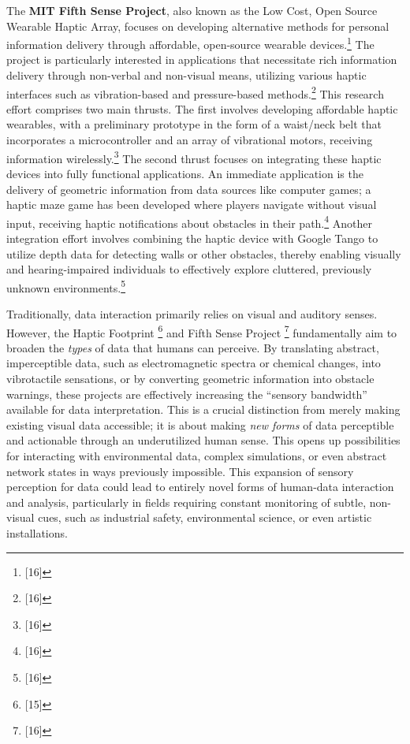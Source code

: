 The \textbf{MIT Fifth Sense Project}, also known as the Low Cost, Open Source Wearable Haptic Array, focuses on developing alternative methods for personal information delivery through affordable, open-source wearable devices.\footnote{[16]} The project is particularly interested in applications that necessitate rich information delivery through non-verbal and non-visual means, utilizing various haptic interfaces such as vibration-based and pressure-based methods.\footnote{[16]} This research effort comprises two main thrusts. The first involves developing affordable haptic wearables, with a preliminary prototype in the form of a waist/neck belt that incorporates a microcontroller and an array of vibrational motors, receiving information wirelessly.\footnote{[16]} The second thrust focuses on integrating these haptic devices into fully functional applications. An immediate application is the delivery of geometric information from data sources like computer games; a haptic maze game has been developed where players navigate without visual input, receiving haptic notifications about obstacles in their path.\footnote{[16]} Another integration effort involves combining the haptic device with Google Tango to utilize depth data for detecting walls or other obstacles, thereby enabling visually and hearing-impaired individuals to effectively explore cluttered, previously unknown environments.\footnote{[16]}

Traditionally, data interaction primarily relies on visual and auditory senses. However, the Haptic Footprint \footnote{[15]} and Fifth Sense Project \footnote{[16]} fundamentally aim to broaden the \textit{types} of data that humans can perceive. By translating abstract, imperceptible data, such as electromagnetic spectra or chemical changes, into vibrotactile sensations, or by converting geometric information into obstacle warnings, these projects are effectively increasing the ``sensory bandwidth'' available for data interpretation. This is a crucial distinction from merely making existing visual data accessible; it is about making \textit{new forms} of data perceptible and actionable through an underutilized human sense. This opens up possibilities for interacting with environmental data, complex simulations, or even abstract network states in ways previously impossible. This expansion of sensory perception for data could lead to entirely novel forms of human-data interaction and analysis, particularly in fields requiring constant monitoring of subtle, non-visual cues, such as industrial safety, environmental science, or even artistic installations.

